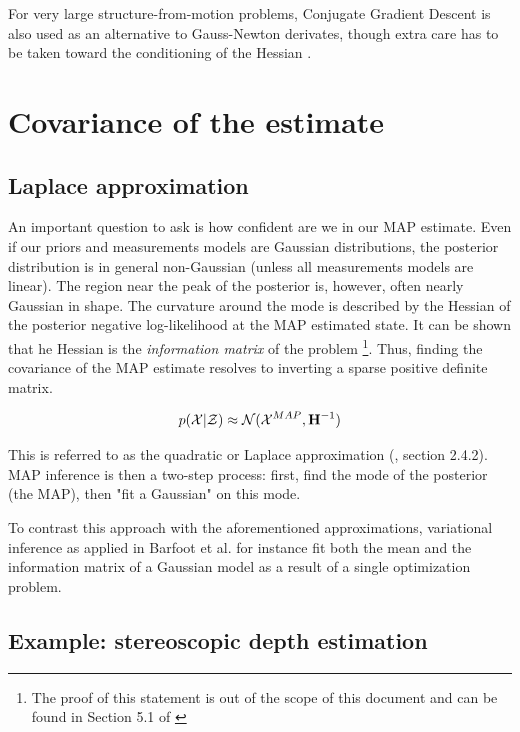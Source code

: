 For very large structure-from-motion problems, Conjugate Gradient Descent is also used as an alternative to Gauss-Newton derivates, though extra care has to 
be taken toward the conditioning of the Hessian \cite{jian2012generalized}.



\section{Covariance of the estimate}
\subsection{Laplace approximation}
\label{sec:map_covariance}
An important question to ask is how confident are we in our MAP estimate. Even if our priors and measurements models are Gaussian distributions, the posterior distribution
is in general non-Gaussian (unless all measurements models are linear). The region near the peak of the posterior is, however, often nearly Gaussian in shape.
The curvature around the mode is described by the Hessian of the posterior negative log-likelihood at the MAP estimated state. 
It can be shown that he Hessian is the \textit{information matrix} of the problem \footnote{The proof of this statement is out of the scope of this document and can be found in Section 5.1 of
\cite{peng2018advanced}}. Thus, finding the covariance of the MAP estimate resolves to inverting a 
sparse positive definite matrix.

\begin{equation}
    p(\mathcal{X} | \mathcal{Z}) \approx \mathcal{N}({\mathcal{X}^{MAP}},{{\bf H}^{-1}})
    \label{eq:map_laplace}
\end{equation}

This is referred to as the quadratic or Laplace approximation (\cite{mcelreath2018statistical}, section 2.4.2). MAP inference is then a two-step process: 
first, find the mode of the posterior (the MAP), then "fit a Gaussian" on this mode. 

To contrast this approach with the aforementioned approximations, variational inference as applied in Barfoot et al. 
 \cite{barfoot2020exactly} for instance fit both the mean and the information matrix of a Gaussian model as a result of a single optimization problem.



\subsection{Example: stereoscopic depth estimation}

